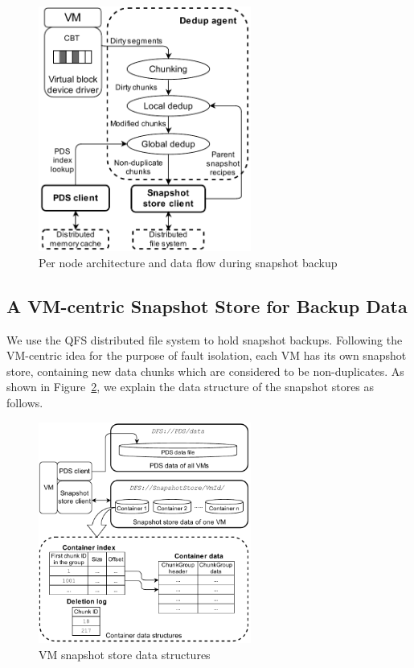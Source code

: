 \begin{figure}[t]
    \centering
    \includegraphics[width=2.75in]{images/socc_arch_cluster}
    \caption{Per node architecture and data flow during snapshot backup}
    \label{fig:arch_vm}
\end{figure}

\subsection{A VM-centric Snapshot Store for Backup Data}
\label{sect:store}
We use the QFS distributed file system to hold snapshot backups.
Following the VM-centric idea for the purpose of fault isolation,
each VM has its own snapshot store, containing new data chunks which are considered
to be non-duplicates.
As shown in Figure~\ref{fig:as_arch}, we explain the data structure of the snapshot stores as follows.
\begin{figure}[t]
  \centering
  \includegraphics[width=2.75in]{images/sstore_arch}
  \caption{VM snapshot store data structures}
  \label{fig:as_arch}
\end{figure}

